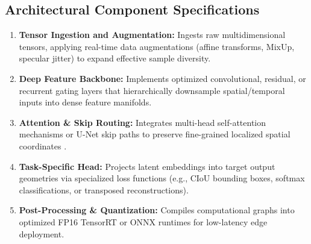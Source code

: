 \subsection{Architectural Component Specifications}
\begin{enumerate}
  \item \textbf{Tensor Ingestion and Augmentation:} Ingests raw multidimensional tensors, applying real-time data augmentations (affine transforms, MixUp, specular jitter) to expand effective sample diversity.
  \item \textbf{Deep Feature Backbone:} Implements optimized convolutional, residual, or recurrent gating layers that hierarchically downsample spatial/temporal inputs into dense feature manifolds.
  \item \textbf{Attention \& Skip Routing:} Integrates multi-head self-attention mechanisms or U-Net skip paths to preserve fine-grained localized spatial coordinates \cite{vaswani2017attention}.
  \item \textbf{Task-Specific Head:} Projects latent embeddings into target output geometries via specialized loss functions (e.g., CIoU bounding boxes, softmax classifications, or transposed reconstructions).
  \item \textbf{Post-Processing \& Quantization:} Compiles computational graphs into optimized FP16 TensorRT or ONNX runtimes for low-latency edge deployment.
\end{enumerate}
